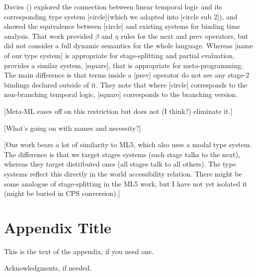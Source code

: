 \documentclass{sigplanconf}
\begin{document}
Davies (\cite{davies96}) explored the connection between linear temporal logic and its corresponding type system [circle](which we adapted into [circle sub 2]), and showed the equivalence between [circle] and existing systems for binding time analysis. That work provided $\beta$ and $\eta$ rules for the next and prev operators, but did not consider a full dynamic semantics for the whole language. Whereas [name of our type system] is appropriate for stage-splitting and partial evaluation, \cite{davies01} provides a similar system, [square], that is appropriate for meta-programming.  The main difference is that terms inside a [prev] operator do not see any stage-2 bindings declared outside of it.  They note that where [circle] corresponds to the non-branching temporal logic, [square] corresponds to the branching version.

[Meta-ML eases off on this restriction but does not (I think?) eliminate it.]

[What's going on with names and necessity?]

[Our work bears a lot of similarity to ML5, which also uses a modal type system.  The difference is that we target stages systems (each stage talks to the next), whereas they target distributed ones (all stages talk to all others). The type systems reflect this directly in the world accessibility relation.  There might be some analogue of stage-splitting in the ML5 work, but I have not yet isolated it (might be buried in CPS conversion).]

\appendix
\section{Appendix Title}

This is the text of the appendix, if you need one.

\acks

Acknowledgments, if needed.




\end{document}
